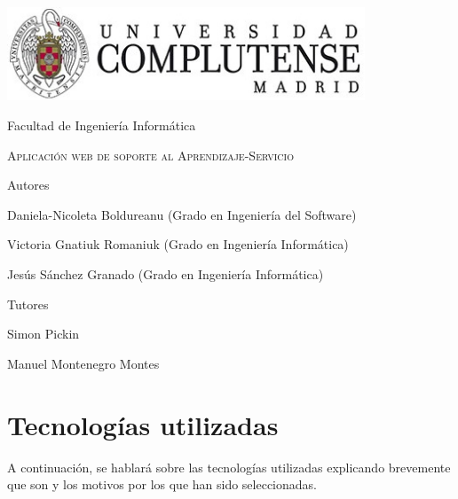 \documentclass[11pt]{book}
\begin{document}
\begin{titlepage}
	\centering
	{\includegraphics[width=0.8\textwidth]{logo}\par}
	\vspace{1cm}
	{\Large Facultad de Ingeniería Informática \par}
	\vspace{3cm}
	{\scshape\Huge Aplicación web de soporte al Aprendizaje-Servicio \par}
	\vspace{5cm}
	{\textbf\Large Autores \par}
	{\Large Daniela-Nicoleta Boldureanu (Grado en Ingeniería del Software)\par}
	{\Large Victoria Gnatiuk Romaniuk (Grado en Ingeniería Informática)\par}
	{\Large Jesús Sánchez Granado (Grado en Ingeniería Informática)\par}
	\vspace{1cm}
	{\textbf\Large Tutores \par}
	{\Large Simon Pickin \par}
	{\Large Manuel Montenegro Montes \par}
	
\end{titlepage}


\tableofcontents
\newpage
\listoffigures

\chapter{Tecnologías utilizadas}
A continuación, se hablará sobre las tecnologías utilizadas explicando brevemente que son y los motivos por los que han sido seleccionadas.
\end{document}
